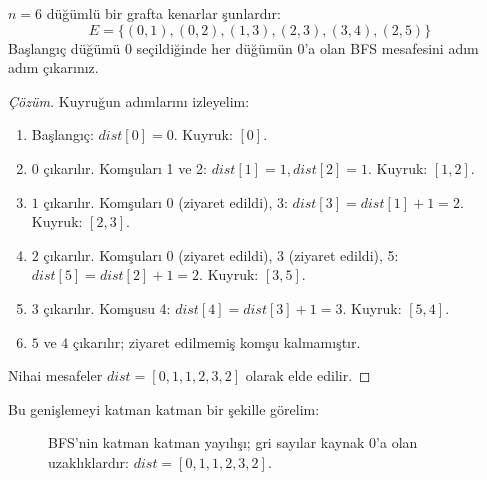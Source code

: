 \begin{example}
$n = 6$ düğümlü bir grafta kenarlar şunlardır:
\[
E = \{(0, 1), (0, 2), (1, 3), (2, 3), (3, 4), (2, 5)\}
\]
Başlangıç düğümü $0$ seçildiğinde her düğümün $0$'a olan BFS mesafesini adım adım çıkarınız.

\begin{proof}[Çözüm]
Kuyruğun adımlarını izleyelim:
\begin{enumerate}
    \item Başlangıç: $dist[0] = 0$. Kuyruk: $[0]$.
    \item $0$ çıkarılır. Komşuları 1 ve 2: $dist[1] = 1, dist[2] = 1$. Kuyruk: $[1, 2]$.
    \item $1$ çıkarılır. Komşuları 0 (ziyaret edildi), 3: $dist[3] = dist[1] + 1 = 2$. Kuyruk: $[2, 3]$.
    \item $2$ çıkarılır. Komşuları 0 (ziyaret edildi), 3 (ziyaret edildi), 5: $dist[5] = dist[2] + 1 = 2$. Kuyruk: $[3, 5]$.
    \item $3$ çıkarılır. Komşusu 4: $dist[4] = dist[3] + 1 = 3$. Kuyruk: $[5, 4]$.
    \item $5$ ve $4$ çıkarılır; ziyaret edilmemiş komşu kalmamıştır.
\end{enumerate}
Nihai mesafeler $dist = [0, 1, 1, 2, 3, 2]$ olarak elde edilir.
\end{proof}
\end{example}

Bu genişlemeyi katman katman bir şekille görelim:

\begin{figure}[ht]
\centering
{}
\caption{BFS'nin katman katman yayılışı; gri sayılar kaynak 0'a olan uzaklıklardır:
$dist = [0, 1, 1, 2, 3, 2]$.}
\end{figure}

